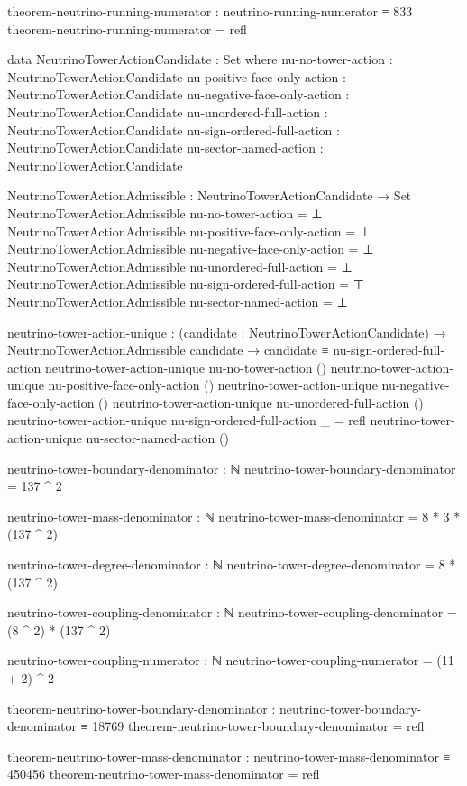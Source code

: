\documentclass[11pt,a4paper]{book}
\begin{document}
\begin{code}
theorem-neutrino-running-numerator : neutrino-running-numerator ≡ 833
theorem-neutrino-running-numerator = refl

data NeutrinoTowerActionCandidate : Set where
  nu-no-tower-action           : NeutrinoTowerActionCandidate
  nu-positive-face-only-action : NeutrinoTowerActionCandidate
  nu-negative-face-only-action : NeutrinoTowerActionCandidate
  nu-unordered-full-action     : NeutrinoTowerActionCandidate
  nu-sign-ordered-full-action  : NeutrinoTowerActionCandidate
  nu-sector-named-action       : NeutrinoTowerActionCandidate

NeutrinoTowerActionAdmissible : NeutrinoTowerActionCandidate → Set
NeutrinoTowerActionAdmissible nu-no-tower-action = ⊥
NeutrinoTowerActionAdmissible nu-positive-face-only-action = ⊥
NeutrinoTowerActionAdmissible nu-negative-face-only-action = ⊥
NeutrinoTowerActionAdmissible nu-unordered-full-action = ⊥
NeutrinoTowerActionAdmissible nu-sign-ordered-full-action = ⊤
NeutrinoTowerActionAdmissible nu-sector-named-action = ⊥

neutrino-tower-action-unique :
  (candidate : NeutrinoTowerActionCandidate) →
  NeutrinoTowerActionAdmissible candidate →
  candidate ≡ nu-sign-ordered-full-action
neutrino-tower-action-unique nu-no-tower-action ()
neutrino-tower-action-unique nu-positive-face-only-action ()
neutrino-tower-action-unique nu-negative-face-only-action ()
neutrino-tower-action-unique nu-unordered-full-action ()
neutrino-tower-action-unique nu-sign-ordered-full-action _ = refl
neutrino-tower-action-unique nu-sector-named-action ()

neutrino-tower-boundary-denominator : ℕ
neutrino-tower-boundary-denominator = 137 ^ 2

neutrino-tower-mass-denominator : ℕ
neutrino-tower-mass-denominator = 8 * 3 * (137 ^ 2)

neutrino-tower-degree-denominator : ℕ
neutrino-tower-degree-denominator = 8 * (137 ^ 2)

neutrino-tower-coupling-denominator : ℕ
neutrino-tower-coupling-denominator = (8 ^ 2) * (137 ^ 2)

neutrino-tower-coupling-numerator : ℕ
neutrino-tower-coupling-numerator = (11 + 2) ^ 2

theorem-neutrino-tower-boundary-denominator :
  neutrino-tower-boundary-denominator ≡ 18769
theorem-neutrino-tower-boundary-denominator = refl

theorem-neutrino-tower-mass-denominator :
  neutrino-tower-mass-denominator ≡ 450456
theorem-neutrino-tower-mass-denominator = refl


\end{code}
\end{document}

